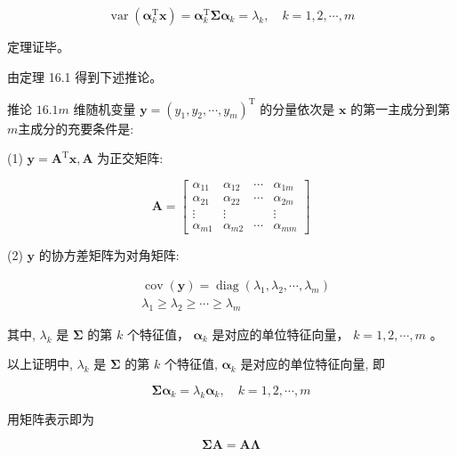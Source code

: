 \documentclass[10pt]{article}
\begin{document}
\begin{equation*}
\operatorname{var}\left(\boldsymbol{\alpha}_{k}^{\mathrm{T}} \boldsymbol{x}\right)=\boldsymbol{\alpha}_{k}^{\mathrm{T}} \boldsymbol{\Sigma} \boldsymbol{\alpha}_{k}=\lambda_{k}, \quad k=1,2, \cdots, m \tag{16.12}
\end{equation*}


定理证毕。

由定理 16.1 得到下述推论。

推论 $16.1 m$ 维随机变量 $\boldsymbol{y}=\left(y_{1}, y_{2}, \cdots, y_{m}\right)^{\mathrm{T}}$ 的分量依次是 $\boldsymbol{x}$ 的第一主成分到第 $m$主成分的充要条件是:

(1) $\boldsymbol{y}=\boldsymbol{A}^{\mathrm{T}} \boldsymbol{x}, \boldsymbol{A}$ 为正交矩阵:

$$
\boldsymbol{A}=\left[\begin{array}{cccc}
\alpha_{11} & \alpha_{12} & \cdots & \alpha_{1 m} \\
\alpha_{21} & \alpha_{22} & \cdots & \alpha_{2 m} \\
\vdots & \vdots & & \vdots \\
\alpha_{m 1} & \alpha_{m 2} & \cdots & \alpha_{m m}
\end{array}\right]
$$

(2) $\boldsymbol{y}$ 的协方差矩阵为对角矩阵:

$$
\begin{aligned}
& \operatorname{cov}(\boldsymbol{y})=\operatorname{diag}\left(\lambda_{1}, \lambda_{2}, \cdots, \lambda_{m}\right) \\
& \lambda_{1} \geqslant \lambda_{2} \geqslant \cdots \geqslant \lambda_{m}
\end{aligned}
$$

其中, $\lambda_{k}$ 是 $\boldsymbol{\Sigma}$ 的第 $k$ 个特征值， $\boldsymbol{\alpha}_{k}$ 是对应的单位特征向量， $k=1,2, \cdots, m$ 。

以上证明中, $\lambda_{k}$ 是 $\boldsymbol{\Sigma}$ 的第 $k$ 个特征值, $\boldsymbol{\alpha}_{k}$ 是对应的单位特征向量, 即


\begin{equation*}
\boldsymbol{\Sigma} \boldsymbol{\alpha}_{k}=\lambda_{k} \boldsymbol{\alpha}_{k}, \quad k=1,2, \cdots, m \tag{16.13}
\end{equation*}


用矩阵表示即为


\begin{equation*}
\boldsymbol{\Sigma} \boldsymbol{A}=\boldsymbol{A} \boldsymbol{\Lambda} \tag{16.14}
\end{equation*}
\end{document}
